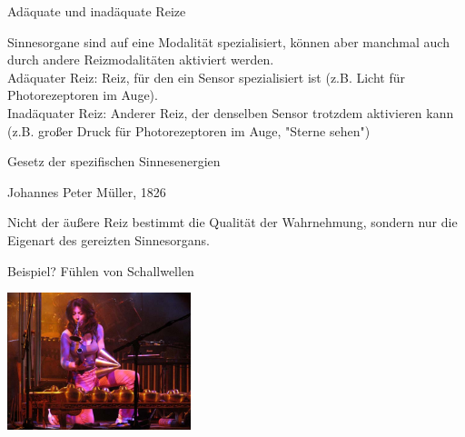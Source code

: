\documentclass[aspectratio=169]{beamer}
\begin{document}
\begin{frame}{Adäquate und inadäquate Reize}

Sinnesorgane sind auf eine Modalität spezialisiert, können aber manchmal auch durch andere Reizmodalitäten aktiviert werden. \\[0.5 cm]




Adäquater Reiz: Reiz, für den ein Sensor spezialisiert ist (z.B. Licht für Photorezeptoren im Auge).  \\[0.2 cm]

Inadäquater Reiz: Anderer Reiz, der denselben Sensor trotzdem aktivieren kann (z.B. großer Druck für Photorezeptoren im Auge, "Sterne sehen") \\ [0.2cm]


\end{frame}




\begin{frame}{Gesetz der spezifischen Sinnesenergien}


\begin{block}{Johannes Peter Müller, 1826}

Nicht der äußere Reiz bestimmt die Qualität der Wahrnehmung, sondern nur die Eigenart des gereizten Sinnesorgans.

\end{block}


 
Beispiel?  Fühlen von Schallwellen
    
    
\begin{center}
    \includegraphics[width=0.4\textwidth]{evelyn_glennie.jpg}
\end{center}


    
\end{frame}
\end{document}
